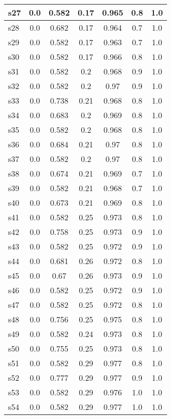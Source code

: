 \documentclass{article}
\begin{document}
\begin{tabular}{|l|c|c|c|c|c|c|}
\hline
s27 &0.0 & 0.582 & 0.17 & 0.965 & 0.8 & 1.0\\
\hline
s28 &0.0 & 0.682 & 0.17 & 0.964 & 0.7 & 1.0\\
\hline
s29 &0.0 & 0.582 & 0.17 & 0.963 & 0.7 & 1.0\\
\hline
s30 &0.0 & 0.582 & 0.17 & 0.966 & 0.8 & 1.0\\
\hline
s31 &0.0 & 0.582 & 0.2 & 0.968 & 0.9 & 1.0\\
\hline
s32 &0.0 & 0.582 & 0.2 & 0.97 & 0.9 & 1.0\\
\hline
s33 &0.0 & 0.738 & 0.21 & 0.968 & 0.8 & 1.0\\
\hline
s34 &0.0 & 0.683 & 0.2 & 0.969 & 0.8 & 1.0\\
\hline
s35 &0.0 & 0.582 & 0.2 & 0.968 & 0.8 & 1.0\\
\hline
s36 &0.0 & 0.684 & 0.21 & 0.97 & 0.8 & 1.0\\
\hline
s37 &0.0 & 0.582 & 0.2 & 0.97 & 0.8 & 1.0\\
\hline
s38 &0.0 & 0.674 & 0.21 & 0.969 & 0.7 & 1.0\\
\hline
s39 &0.0 & 0.582 & 0.21 & 0.968 & 0.7 & 1.0\\
\hline
s40 &0.0 & 0.673 & 0.21 & 0.969 & 0.8 & 1.0\\
\hline
s41 &0.0 & 0.582 & 0.25 & 0.973 & 0.8 & 1.0\\
\hline
s42 &0.0 & 0.758 & 0.25 & 0.973 & 0.9 & 1.0\\
\hline
s43 &0.0 & 0.582 & 0.25 & 0.972 & 0.9 & 1.0\\
\hline
s44 &0.0 & 0.681 & 0.26 & 0.972 & 0.8 & 1.0\\
\hline
s45 &0.0 & 0.67 & 0.26 & 0.973 & 0.9 & 1.0\\
\hline
s46 &0.0 & 0.582 & 0.25 & 0.972 & 0.9 & 1.0\\
\hline
s47 &0.0 & 0.582 & 0.25 & 0.972 & 0.8 & 1.0\\
\hline
s48 &0.0 & 0.756 & 0.25 & 0.975 & 0.8 & 1.0\\
\hline
s49 &0.0 & 0.582 & 0.24 & 0.973 & 0.8 & 1.0\\
\hline
s50 &0.0 & 0.755 & 0.25 & 0.973 & 0.8 & 1.0\\
\hline
s51 &0.0 & 0.582 & 0.29 & 0.977 & 0.8 & 1.0\\
\hline
s52 &0.0 & 0.777 & 0.29 & 0.977 & 0.9 & 1.0\\
\hline
s53 &0.0 & 0.582 & 0.29 & 0.976 & 1.0 & 1.0\\
\hline
s54 &0.0 & 0.582 & 0.29 & 0.977 & 1.0 & 1.0\\
\hline

\end{tabular}
\end{document}
